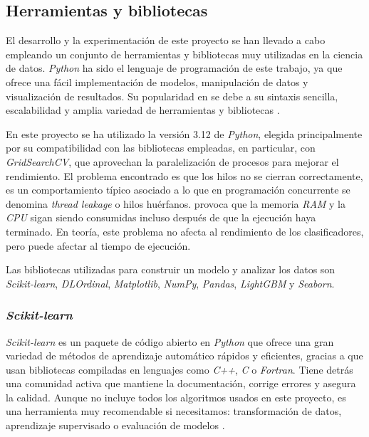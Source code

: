 \subsection{Herramientas y bibliotecas}
\label{subsec:herramientas}

El desarrollo y la experimentación de este proyecto se han llevado a cabo empleando un conjunto de herramientas y bibliotecas muy utilizadas en la ciencia de datos. \textit{Python} ha sido el lenguaje de programación de este trabajo, ya que ofrece una fácil implementación de modelos, manipulación de datos y visualización de resultados. Su popularidad en se debe a su sintaxis sencilla, escalabilidad y amplia variedad de herramientas y bibliotecas \cite{python_ml}.

\vspace{1em}

En este proyecto se ha utilizado la versión 3.12 de \textit{Python}, elegida principalmente por su compatibilidad con las bibliotecas empleadas, en particular, con \textit{GridSearchCV}, que aprovechan la paralelización de procesos para mejorar el rendimiento. El problema encontrado es que los hilos no se cierran correctamente, es un comportamiento típico asociado a lo que en programación concurrente se denomina \textit{thread leakage} o hilos huérfanos. provoca que la memoria \textit{RAM} y la \textit{CPU} sigan siendo consumidas incluso después de que la ejecución haya terminado. En teoría, este problema no afecta al rendimiento de los clasificadores, pero puede afectar al tiempo de ejecución.

\vspace{1em}

Las bibliotecas utilizadas para construir un modelo y analizar los datos son \textit{Scikit-learn}, \textit{DLOrdinal}, \textit{Matplotlib}, \textit{NumPy}, \textit{Pandas}, \textit{LightGBM} y \textit{Seaborn}.

\subsubsection{\textit{Scikit-learn}}
\label{subsubsec:sklearn}

\textit{Scikit-learn} es un paquete de código abierto en \textit{Python} que ofrece una gran variedad de métodos de aprendizaje automático rápidos y eficientes, gracias a que usan bibliotecas compiladas en lenguajes como \textit{C++}, \textit{C} o \textit{Fortran}. Tiene detrás una comunidad activa que mantiene la documentación, corrige errores y asegura la calidad. Aunque no incluye todos los algoritmos usados en este proyecto, es una herramienta muy recomendable si necesitamos: transformación de datos, aprendizaje supervisado o evaluación de modelos \cite{hao2019scikit}.

